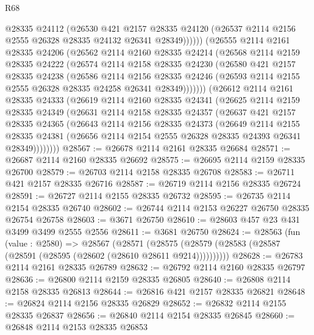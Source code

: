 \begin{lexlean}{R68}
\begin{coremodule}
            @28335
            @24112
            (@26530
              @421
              @2157
              @28335
              @24120
              (@26537 @2114 @2156 @2555 @26328 @28335 @24132 @26341 @28349))))))
    (@26555
      @2114
      @2161
      @28335
      @24206
      (@26562
        @2114
        @2160
        @28335
        @24214
        (@26568
          @2114
          @2159
          @28335
          @24222
          (@26574
            @2114
            @2158
            @28335
            @24230
            (@26580
              @421
              @2157
              @28335
              @24238
              (@26586
                @2114
                @2156
                @28335
                @24246
                (@26593 @2114 @2155 @2555 @26328 @28335 @24258 @26341 @28349)))))))
    (@26612
      @2114
      @2161
      @28335
      @24333
      (@26619
        @2114
        @2160
        @28335
        @24341
        (@26625
          @2114
          @2159
          @28335
          @24349
          (@26631
            @2114
            @2158
            @28335
            @24357
            (@26637
              @421
              @2157
              @28335
              @24365
              (@26643
                @2114
                @2156
                @28335
                @24373
                (@26649
                  @2114
                  @2155
                  @28335
                  @24381
                  (@26656 @2114 @2154 @2555 @26328 @28335 @24393 @26341 @28349))))))))
@28567 := @26678 @2114 @2161 @28335 @26684
@28571 := @26687 @2114 @2160 @28335 @26692
@28575 := @26695 @2114 @2159 @28335 @26700
@28579 := @26703 @2114 @2158 @28335 @26708
@28583 := @26711 @421 @2157 @28335 @26716
@28587 := @26719 @2114 @2156 @28335 @26724
@28591 := @26727 @2114 @2155 @28335 @26732
@28595 := @26735 @2114 @2154 @28335 @26740
@28602 := @26744 @2114 @2153 @26227 @26750 @28335 @26754 @26758
@28603 := @3671 @26750
@28610 := @28603 @457 @23 @431 @3499 @3499 @2555 @2556
@28611 := @3681 @26750
@28624 := @28563
    (fun (value : @2580) =>
    @28567
      (@28571 (@28575 (@28579 (@28583 (@28587 (@28591 (@28595 (@28602 (@28610 @28611 @9214))))))))))
@28628 := @26783 @2114 @2161 @28335 @26789
@28632 := @26792 @2114 @2160 @28335 @26797
@28636 := @26800 @2114 @2159 @28335 @26805
@28640 := @26808 @2114 @2158 @28335 @26813
@28644 := @26816 @421 @2157 @28335 @26821
@28648 := @26824 @2114 @2156 @28335 @26829
@28652 := @26832 @2114 @2155 @28335 @26837
@28656 := @26840 @2114 @2154 @28335 @26845
@28660 := @26848 @2114 @2153 @28335 @26853

\end{coremodule}
\end{lexlean}
